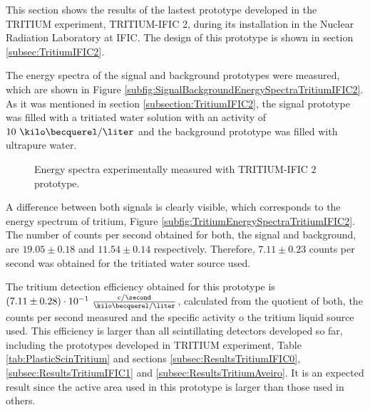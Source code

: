 This section shows the results of the lastest prototype developed in the TRITIUM experiment, TRITIUM-IFIC 2, during its installation in the Nuclear Radiation Laboratory at IFIC. The design of this prototype is shown in section \ref{subsec:TritiumIFIC2}.

The energy spectra of the signal and background prototypes were measured, which are shown in Figure \ref{subfig:SignalBackgroundEnergySpectraTritiumIFIC2}. As it was mentioned in section \ref{subsection:TritiumIFIC2}, the signal prototype was filled with a tritiated water solution with an activity of $10~\kilo\becquerel/\liter$ and the background prototype was filled with ultrapure water.

\begin{figure}[h]
 \centering
   \newline
 \caption{Energy spectra experimentally measured with TRITIUM-IFIC 2 prototype.}
 \label{fig:EnergySpectraTRITIUMIFIC2}
\end{figure}

A difference between both signals is clearly visible, which corresponds to the energy spectrum of tritium, Figure \ref{subfig:TritiumEnergySpectraTritiumIFIC2}. The number of counts per second obtained for both, the signal and background, are $19.05 \pm 0.18$ and $11.54 \pm 0.14$ respectively. Therefore, $7.11 \pm 0.23$ counts per second was obtained for the tritiated water source used.

The tritium detection efficiency obtained for this prototype is $(7.11 \pm 0.28)\cdot{} 10^{-1}~ \frac{\text{c}/\second}{\kilo\becquerel/\liter}$, calculated from the quotient of both, the counts per second measured and the specific activity o the tritium liquid source used. This efficiency is larger than all scintillating detectors developed so far, including the prototypes developed in TRITIUM experiment, Table \ref{tab:PlasticScinTritium} and sections \ref{subsec:ResultsTritiumIFIC0}, \ref{subsec:ResultsTritiumIFIC1} and \ref{subsec:ResultsTritiumAveiro}. It is an expected result since the active area used in this prototype is larger than those used in others.

